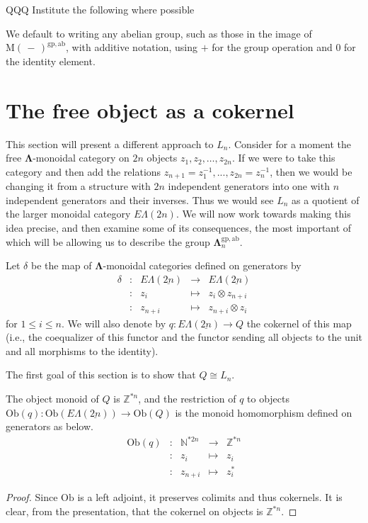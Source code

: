 \documentclass{amsbook} %
\newcommand{\ZZ}{\mathbb{Z}}
\newcommand{\ML}{\mathbf{\Lambda}}
\newcommand{\MLn}{\mathbf{\Lambda}_n}
\newcommand{\EL}{E\Lambda}
\newcommand{\ELnn}{E\Lambda(\underline{2n})}
\newcommand{\ob}{\textrm{Ob}}
\numberwithin{section}{chapter}
\begin{document}
QQQ Institute the following where possible
\begin{conv}\label{plus}
We default to writing any abelian group, such as those in the image of $\mathrm{M}(\, - \,)^{\mathrm{gp},\mathrm{ab}}$, with additive notation, using $+$ for the group operation and 0 for the identity element.
\end{conv}



\section{The free object as a cokernel}
\label{colimalgebra} 
This section will present a different approach to $L_n$. Consider for a moment the free $\ML$-monoidal category on $2n$ objects $z_1, z_2, \ldots, z_{2n}$. If we were to take this category and then add the relations $z_{n+1} = z_1^{-1}, ..., z_{2n} = z_n^{-1}$, then we would be changing it from a structure with $2n$ independent generators into one with $n$ independent generators and their inverses. Thus we would see $L_n$ as a quotient of the larger monoidal category $\EL(2n)$. We will now work towards making this idea precise, and then examine some of its consequences, the most important of which will be allowing us to describe the group $\MLn^{\mathrm{gp},\mathrm{ab}}$.





\begin{Defi}\label{qdef} Let $\delta$ be the map of $\ML$-monoidal categories defined on generators by
\[ \begin{array}{rlrlll}
			\delta & : & \EL(\underline{2n}) & \to & \EL(\underline{2n}) \\
			& : & z_{i} & \mapsto & z_i \otimes z_{n+i} \\
			& : & z_{n+i} & \mapsto & z_{n+i} \otimes z_i			
		\end{array}
\]
for $1 \le i \le n$. We will also denote by $q: \EL(\underline{2n}) \to Q$ the cokernel of this map (i.e., the coequalizer of this functor and the functor sending all objects to the unit and all morphisms to the identity).  
\end{Defi}


The first goal of this section is to show that $Q \cong L_n$.

\begin{prop}\label{Qobj} The object monoid of $Q$ is $\mathbb{Z}^{*n}$, and the restriction of $q$ to objects $\mathrm{Ob}(q): \mathrm{Ob}(\ELnn) \to \mathrm{Ob}(Q)$ is the monoid homomorphism defined on generators as below.
\[ \begin{array}{rlrlll}
			\mathrm{Ob}(q) & : & \mathbb{N}^{\ast 2n} & \to & \mathbb{Z}^{\ast n} \\
			& : & z_i & \mapsto & z_i  \\
			& : & z_{n+i} & \mapsto & z_i^*		
		\end{array}
\]
\end{prop}
\begin{proof}
Since $\ob$ is a left adjoint, it preserves colimits and thus cokernels. It is clear, from the presentation, that the cokernel on objects is $\ZZ^{*n}$.
\end{proof}
\end{document}
